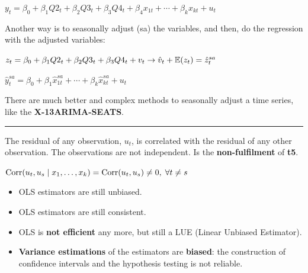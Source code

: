 \begin{f}[Seasonality]
\begin{center}
	\(y_{t} = \beta_{0} + \beta_{1} Q2_{t} + \beta_{2} Q3_{t} + \beta_{3} Q4_{t} + \beta_{4} x_{1t} + \cdots + \beta_{k} x_{kt} + u_{t}\)
\end{center}

Another way is to seasonally adjust (sa) the variables, and then, do the regression with the adjusted variables:

\begin{center}
	\(z_{t} = \beta_{0} + \beta_{1} Q2_{t} + \beta_{2} Q3_{t} + \beta_{3} Q4_{t} + v_{t} \rightarrow \hat{v}_{t} + \mathbb{E}(z_{t}) = \hat{z}_{t}^{sa}\)
	
	\(\hat{y}_{t}^{sa}= \beta_{0} + \beta_{1} \hat{x}_{1t}^{sa} + \cdots + \beta_{k} \hat{x}_{kt}^{sa} + u_{t}\)
\end{center}

There are much better and complex methods to seasonally adjust a time series, like the \textbf{X-13ARIMA-SEATS}.

\end{f}  \hrule

\begin{f}[Autocorrelation]

The residual of any observation, \(u_{t}\), is correlated with the residual of any other observation. The observations are not independent. Is the \textbf{non-fulfilment} of \textbf{t5}.

\begin{center}
	\(\mathrm{Corr}(u_{t}, u_{s} \mid x_{1}, \ldots, x_{k}) = \mathrm{Corr}(u_{t}, u_{s}) \neq 0, \; \forall t \neq s\)
\end{center}

\end{f}    
\begin{f}[Consequences]

\begin{itemize}[leftmargin=*]
	\item OLS estimators are still unbiased.
	\item OLS estimators are still consistent.
	\item OLS is \textbf{not efficient} any more, but still a LUE (Linear Unbiased Estimator).
	\item \textbf{Variance estimations} of the estimators are \textbf{biased}: the construction of confidence intervals and the hypothesis testing is not reliable.
\end{itemize}

\end{f}    

